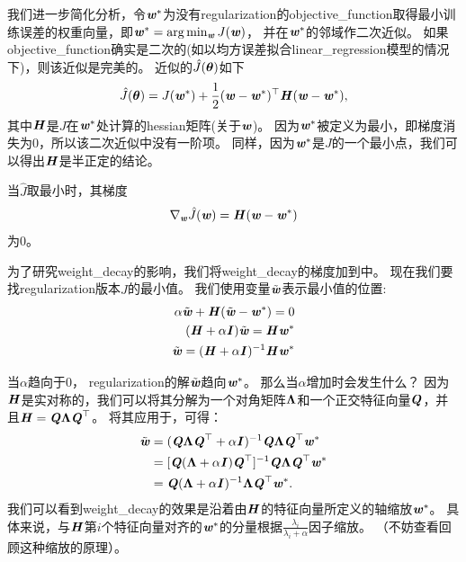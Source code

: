 我们进一步简化分析，令$\Vw^*$为没有\gls{regularization}的\gls{objective_function}取得最小训练误差的权重向量，即$\Vw^* = \argmin_{\Vw} J(\Vw)$， 并在$\Vw^*$的邻域作二次近似。
如果\gls{objective_function}确实是二次的(如以均方误差拟合\gls{linear_regression}模型的情况下)，则该近似是完美的。
近似的$\hat J(\Vtheta)$如下
\begin{align}
 \hat J(\Vtheta) = J(\Vw^*) + \frac{1}{2}(\Vw - \Vw^*)^\top \MH (\Vw - \Vw^*),
\end{align}
其中$\MH$是$J$在$\Vw^*$处计算的\gls{hessian}矩阵(关于$\Vw$)。
因为$\Vw^*$被定义为最小，即梯度消失为0，所以该二次近似中没有一阶项。
同样，因为$\Vw^*$是$J$的一个最小点，我们可以得出$\MH$是半正定的结论。

当$\hat J$取最小时，其梯度
\begin{align}
\label{eq:gradient}
  \nabla_{\Vw} \hat{J}(\Vw) = \MH (\Vw - \Vw^*)
\end{align}
为0。

为了研究\gls{weight_decay}的影响，我们将\gls{weight_decay}的梯度加到中。 
现在我们要找\gls{regularization}版本$\hat J$的最小值。
我们使用变量$\tilde{\Vw}$表示最小值的位置:
\begin{align}
 \alpha \tilde{\Vw} + \MH (\tilde{\Vw} - \Vw^*) = 0 \\
 (\MH + \alpha \MI) \tilde{\Vw} = \MH \Vw^* \\
 \tilde{\Vw} = (\MH + \alpha \MI)^{-1} \MH \Vw^* \label{eq:final_w}
 \end{align}

当$\alpha$趋向于0， \gls{regularization}的解$\tilde{\Vw}$趋向$\Vw^*$。 
那么当$\alpha$增加时会发生什么？
因为$\MH$是实对称的，我们可以将其分解为一个对角矩阵$\VLambda$和一个正交特征向量$\MQ$，并且$\MH = \MQ \VLambda \MQ^\top$。
将其应用于，可得：
\begin{align}
 \tilde \Vw &= ( \MQ \VLambda \MQ^\top + \alpha \MI)^{-1} \MQ \VLambda \MQ^\top \Vw^* \\
                 &=  [ \MQ( \VLambda+ \alpha \MI)  \MQ^\top ]^{-1} \MQ \VLambda \MQ^\top \Vw^* \\
                 &= \MQ( \VLambda+ \alpha \MI)^{-1} \VLambda \MQ^\top \Vw^*. \label{eq:713L2}
\end{align}
我们可以看到\gls{weight_decay}的效果是沿着由$\MH$的特征向量所定义的轴缩放$\Vw^*$。
具体来说，与$\MH$第$i$个特征向量对齐的$\Vw^*$的分量根据$\frac{\lambda_i}{\lambda_i + \alpha}$因子缩放。
（不妨查看回顾这种缩放的原理）。

